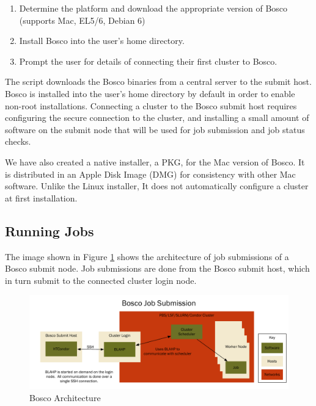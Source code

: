 \begin{enumerate}
\item Determine the platform and download the appropriate version of Bosco (supports Mac, EL5/6, Debian 6)
\item Install Bosco into the user's home directory.
\item Prompt the user for details of connecting their first cluster to Bosco.
\end{enumerate}

The script downloads the Bosco binaries from a central server to the submit host.  Bosco is installed into the user's home directory by default in order to enable non-root installations.  Connecting a cluster to the Bosco submit host requires configuring the secure connection to the cluster, and installing a small amount of software on the submit node that will be used for job submission and job status checks.

We have also created a native installer, a PKG, for the Mac version of Bosco.  It is distributed in an Apple Disk Image (DMG) for consistency with other Mac software.  Unlike the Linux installer, It does not automatically configure a cluster at first installation.


\subsection{Running Jobs}

The image shown in Figure \ref{fig:archgraph1} shows the architecture of job submissions of a Bosco submit node.  Job submissions are done from the Bosco submit host, which in turn submit to the connected cluster login node.  

\begin{figure}[ht!]
\includegraphics[width=\textwidth]{images/ArchitectureGraph1}
\caption{Bosco Architecture}
\label{fig:archgraph1}
\end{figure}

